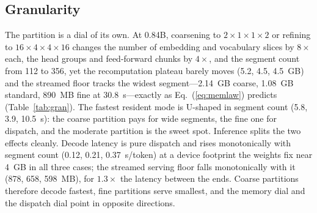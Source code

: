 \documentclass[journal]{IEEEtran}
\begin{document}
\subsection{Granularity}\label{sec:gran}
The partition is a dial of its own. At 0.84B, coarsening to
$2{\times}1{\times}1{\times}2$ or refining to $16{\times}4{\times}4{\times}16$
changes the number of embedding and vocabulary slices by $8\times$ each,
the head groups and feed-forward chunks by $4\times$, and the
segment count from 112 to 356, yet the recomputation plateau barely moves
(5.2, 4.5, 4.5~GB) and the streamed floor tracks the widest
segment---2.14~GB coarse, 1.08~GB standard, 890~MB fine at
30.8~s---exactly as Eq.~(\ref{eq:memlaw}) predicts (Table~\ref{tab:gran}).
The fastest resident
mode is U-shaped in segment count (5.8, 3.9, 10.5~s): the coarse partition
pays for wide segments, the fine one for dispatch, and the moderate
partition is the sweet spot. Inference splits the two effects cleanly.
Decode latency is pure dispatch and rises monotonically with segment count
(0.12, 0.21, 0.37~s/token) at a device footprint the weights fix near 4~GB in
all three cases; the streamed serving floor falls monotonically with it
(878, 658, 598~MB), for $1.3\times$ the latency between the ends.
Coarse partitions therefore decode fastest, fine partitions serve smallest,
and the memory dial and the dispatch dial point in opposite directions.
\end{document}

